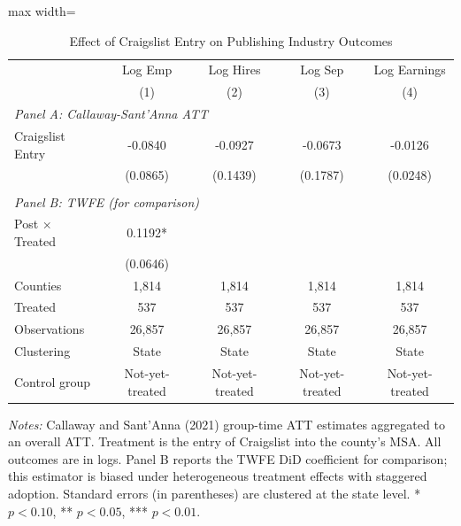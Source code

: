 \begin{table}[htbp]
\centering
\caption{Effect of Craigslist Entry on Publishing Industry Outcomes}
\label{tab:main}
\begin{threeparttable}
\begin{adjustbox}{max width=\textwidth}
\begin{tabular}{lcccc}
\toprule
 & Log Emp & Log Hires & Log Sep & Log Earnings \\
 & (1) & (2) & (3) & (4) \\
\midrule
\multicolumn{5}{l}{\textit{Panel A: Callaway-Sant'Anna ATT}} \\
Craigslist Entry & -0.0840 & -0.0927 & -0.0673 & -0.0126 \\
 & (0.0865) & (0.1439) & (0.1787) & (0.0248) \\
 & & & & \\
\multicolumn{5}{l}{\textit{Panel B: TWFE (for comparison)}} \\
Post $\times$ Treated & 0.1192* & & & \\
 & (0.0646) & & & \\
\midrule
Counties & 1,814 & 1,814 & 1,814 & 1,814 \\
Treated & 537 & 537 & 537 & 537 \\
Observations & 26,857 & 26,857 & 26,857 & 26,857 \\
Clustering & State & State & State & State \\
Control group & Not-yet-treated & Not-yet-treated & Not-yet-treated & Not-yet-treated \\
\bottomrule
\end{tabular}
\end{adjustbox}
\begin{tablenotes}[flushleft]
\small
\item \textit{Notes:} Callaway and Sant'Anna (2021) group-time ATT estimates aggregated to an overall ATT. Treatment is the entry of Craigslist into the county's MSA. All outcomes are in logs. Panel B reports the TWFE DiD coefficient for comparison; this estimator is biased under heterogeneous treatment effects with staggered adoption. Standard errors (in parentheses) are clustered at the state level. * $p<0.10$, ** $p<0.05$, *** $p<0.01$.
\end{tablenotes}
\end{threeparttable}
\end{table}

